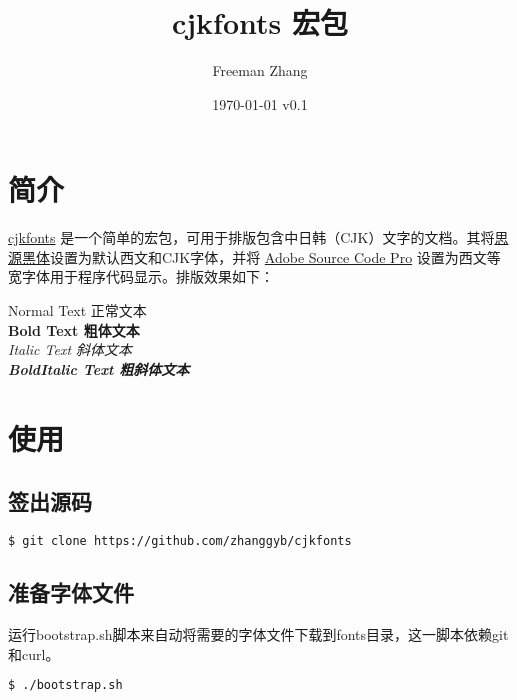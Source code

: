 \documentclass[oneside,final]{article}
\begin{document}
\title{cjkfonts 宏包}
\author{Freeman Zhang}
\date{\today{} v0.1}

\maketitle

\section{简介}

\href{https://github.com/zhanggyb/cjkfonts}{cjkfonts} 是一个简单的\XeLaTeX{}宏包，可用于排版包含中日韩（CJK）文字的文档。其将\href{https://github.com/adobe-fonts/source-han-sans}{思源黑体}设置为默认西文和CJK字体，并将 \href{https://github.com/adobe-fonts/source-code-pro}{Adobe Source Code Pro} 设置为西文等宽字体用于程序代码显示。排版效果如下：

\begin{center}
  Normal Text 正常文本 \\
  \vspace{1em}
  \textbf{Bold Text 粗体文本} \\
  \vspace{1em}
  \textit{Italic Text 斜体文本} \\
  \vspace{1em}
  \textbf{\textit{BoldItalic Text 粗斜体文本}}
\end{center}

\section{使用}

\subsection{签出源码}

\begin{lstlisting}[language=sh]
$ git clone https://github.com/zhanggyb/cjkfonts
\end{lstlisting}

\subsection{准备字体文件}

运行bootstrap.sh脚本来自动将需要的字体文件下载到fonts目录，这一脚本依赖git和curl。

\begin{lstlisting}[language=sh]
$ ./bootstrap.sh
\end{lstlisting}
\end{document}
